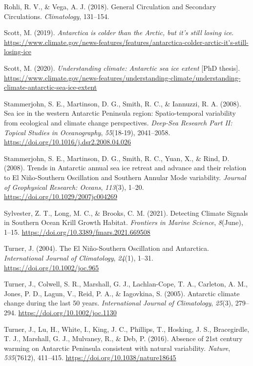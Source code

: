 \documentclass[
]{article}
\newlength{\cslhangindent}
\newenvironment{cslreferences}%
  {\setlength{\parindent}{0pt}%
  \everypar{\setlength{\hangindent}{\cslhangindent}}\ignorespaces}%
  {\par}
\begin{document}
\begin{cslreferences}
\leavevmode\hypertarget{ref-Rohli2018}{}%
Rohli, R. V., \& Vega, A. J. (2018). General Circulation and Secondary
Circulations. \emph{Climatology}, 131--154.

\leavevmode\hypertarget{ref-Scott2019}{}%
Scott, M. (2019). \emph{Antarctica is colder than the Arctic, but it's
still losing ice}.
\url{https://www.climate.gov/news-features/features/antarctica-colder-arctic-it's-still-losing-ice}

\leavevmode\hypertarget{ref-Scott2020}{}%
Scott, M. (2020). \emph{Understanding climate: Antarctic sea ice extent}
{[}PhD thesis{]}.
\url{https://www.climate.gov/news-features/understanding-climate/understanding-climate-antarctic-sea-ice-extent}

\leavevmode\hypertarget{ref-Stammerjohn2008a}{}%
Stammerjohn, S. E., Martinson, D. G., Smith, R. C., \& Iannuzzi, R. A.
(2008). Sea ice in the western Antarctic Peninsula region:
Spatio-temporal variability from ecological and climate change
perspectives. \emph{Deep-Sea Research Part II: Topical Studies in
Oceanography}, \emph{55}(18-19), 2041--2058.
\url{https://doi.org/10.1016/j.dsr2.2008.04.026}

\leavevmode\hypertarget{ref-Stammerjohn2008}{}%
Stammerjohn, S. E., Martinson, D. G., Smith, R. C., Yuan, X., \& Rind,
D. (2008). Trends in Antarctic annual sea ice retreat and advance and
their relation to El Niño-Southern Oscillation and Southern Annular Mode
variability. \emph{Journal of Geophysical Research: Oceans},
\emph{113}(3), 1--20. \url{https://doi.org/10.1029/2007jc004269}

\leavevmode\hypertarget{ref-Sylvester2021}{}%
Sylvester, Z. T., Long, M. C., \& Brooks, C. M. (2021). Detecting
Climate Signals in Southern Ocean Krill Growth Habitat. \emph{Frontiers
in Marine Science}, \emph{8}(June), 1--15.
\url{https://doi.org/10.3389/fmars.2021.669508}

\leavevmode\hypertarget{ref-Turner2004}{}%
Turner, J. (2004). The El Niño-Southern Oscillation and Antarctica.
\emph{International Journal of Climatology}, \emph{24}(1), 1--31.
\url{https://doi.org/10.1002/joc.965}

\leavevmode\hypertarget{ref-Turner2005}{}%
Turner, J., Colwell, S. R., Marshall, G. J., Lachlan-Cope, T. A.,
Carleton, A. M., Jones, P. D., Lagun, V., Reid, P. A., \& Iagovkina, S.
(2005). Antarctic climate change during the last 50 years.
\emph{International Journal of Climatology}, \emph{25}(3), 279--294.
\url{https://doi.org/10.1002/joc.1130}

\leavevmode\hypertarget{ref-Turner2016}{}%
Turner, J., Lu, H., White, I., King, J. C., Phillips, T., Hosking, J.
S., Bracegirdle, T. J., Marshall, G. J., Mulvaney, R., \& Deb, P.
(2016). Absence of 21st century warming on Antarctic Peninsula
consistent with natural variability. \emph{Nature}, \emph{535}(7612),
411--415. \url{https://doi.org/10.1038/nature18645}


\end{cslreferences}
\end{document}
